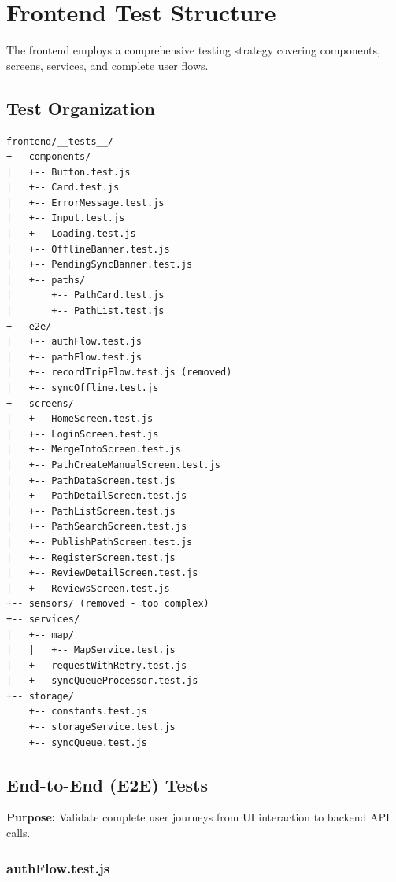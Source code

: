 \section{Frontend Test Structure}
\label{sec:frontend_test_structure}

The frontend employs a comprehensive testing strategy covering components, screens, services, and complete user flows.

\subsection{Test Organization}
\label{subsec:frontend_test_organization}

\begin{verbatim}
frontend/__tests__/
+-- components/
|   +-- Button.test.js
|   +-- Card.test.js
|   +-- ErrorMessage.test.js
|   +-- Input.test.js
|   +-- Loading.test.js
|   +-- OfflineBanner.test.js
|   +-- PendingSyncBanner.test.js
|   +-- paths/
|       +-- PathCard.test.js
|       +-- PathList.test.js
+-- e2e/
|   +-- authFlow.test.js
|   +-- pathFlow.test.js
|   +-- recordTripFlow.test.js (removed)
|   +-- syncOffline.test.js
+-- screens/
|   +-- HomeScreen.test.js
|   +-- LoginScreen.test.js
|   +-- MergeInfoScreen.test.js
|   +-- PathCreateManualScreen.test.js
|   +-- PathDataScreen.test.js
|   +-- PathDetailScreen.test.js
|   +-- PathListScreen.test.js
|   +-- PathSearchScreen.test.js
|   +-- PublishPathScreen.test.js
|   +-- RegisterScreen.test.js
|   +-- ReviewDetailScreen.test.js
|   +-- ReviewsScreen.test.js
+-- sensors/ (removed - too complex)
+-- services/
|   +-- map/
|   |   +-- MapService.test.js
|   +-- requestWithRetry.test.js
|   +-- syncQueueProcessor.test.js
+-- storage/
    +-- constants.test.js
    +-- storageService.test.js
    +-- syncQueue.test.js
\end{verbatim}

\subsection{End-to-End (E2E) Tests}
\label{subsec:frontend_e2e_tests}

\textbf{Purpose:} Validate complete user journeys from UI interaction to backend API calls.

\subsubsection{authFlow.test.js}
\label{subsubsec:auth_flow_test}

